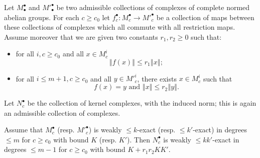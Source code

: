 \begin{proposition}
  \label{weakdualsnakelemma}
  \leanok
  Let $M^\bullet_\bullet$ and $M'^\bullet_\bullet$ be two admissible collections
  of complexes of complete normed abelian groups.
  For each $c\geq c_0$ let $f^\bullet_c: M^\bullet_c\to M'^\bullet_c$ be a collection of maps
  between these collections of complexes which all commute with all restriction maps.
  Assume moreover that we are given two constants $r_1, r_2 \geq 0$ such that:
  \begin{itemize}
   \item for all $i, c\geq c_0$ and all $x\in M^i_c$
    \[
    ‖f(x)‖ ≤ r_1‖x‖;
    \]
   \item for all $i ≤ m+1, c \geq c_0$ and all $y\in M'^i_c$, there exists $x\in M^i_c$ such that
   \[
    f(x) = y \mbox{ and } ‖x‖ ≤ r_2‖y‖.
   \]

  \end{itemize}

  Let $N^\bullet_c$ be the collection of kernel complexes, with the induced norm;
  this is again an admissible collection of complexes.

  Assume that $M^\bullet_c$ (resp. $M'^\bullet_c$) is weakly $\leq k$-exact
  (resp. $≤ k'$-exact) in degrees $\leq m$ for $c\geq c_0$ with bound $K$
  (resp. $K'$).
  Then $N^\bullet_c$ is weakly $\leq kk'$-exact in degrees $\leq m-1$ for $c\geq c_0$
  with bound $K + r_1r_2KK'$.
\end{proposition}


